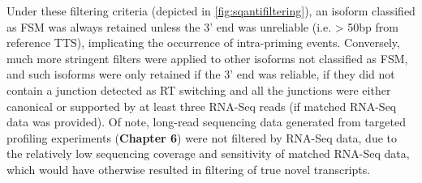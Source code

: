 Under these filtering criteria (depicted in \cref{fig:sqantifiltering}), an isoform classified as FSM was always retained unless the 3' end was unreliable (i.e. > 50bp from reference TTS), implicating the occurrence of intra-priming events. Conversely, much more stringent filters were applied to other isoforms not classified as FSM, and such isoforms were only retained if the 3' end was reliable, if they did not contain a junction detected as RT switching and all the junctions were either canonical or supported by at least three RNA-Seq reads (if matched RNA-Seq data was provided). Of note, long-read sequencing data generated from targeted profiling experiments (\textbf{Chapter 6}) were not filtered by RNA-Seq data, due to the relatively low sequencing coverage and sensitivity of matched RNA-Seq data, which would have otherwise resulted in filtering of true novel transcripts. 

